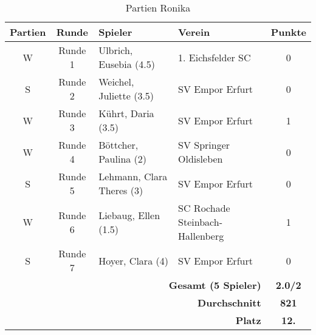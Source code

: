 \begin{table}[H]
\begin{tabular}{|c|c|l|l|c|}
\hline
\textbf{Partien} & \textbf{Runde} & \textbf{Spieler} & \textbf{Verein} & \textbf{Punkte} \\ \hline
W & Runde 1 & Ulbrich, Eusebia (4.5) & 1. Eichsfelder SC & 0 \\ \hline
S & Runde 2 & Weichel, Juliette (3.5) & SV Empor Erfurt & 0 \\ \hline
W & Runde 3 & Kührt, Daria (3.5) & SV Empor Erfurt & 1 \\ \hline
W & Runde 4 & Böttcher, Paulina (2) & SV Springer Oldisleben & 0 \\ \hline
S & Runde 5 & Lehmann, Clara Theres (3) & SV Empor Erfurt & 0 \\ \hline
W & Runde 6 & Liebaug, Ellen (1.5) & SC Rochade Steinbach-Hallenberg & 1 \\ \hline
S & Runde 7 & Hoyer, Clara (4) & SV Empor Erfurt & 0 \\ \hline
\multicolumn{4}{|r|}{\textbf{Gesamt (5 Spieler)}} & \textbf{2.0/2} \\ \hline
\multicolumn{4}{|r|}{\textbf{Durchschnitt}} & \textbf{821} \\ \hline
\multicolumn{4}{|r|}{\textbf{Platz}} & \textbf{12.} \\ \hline
\end{tabular}
\caption{Partien Ronika}
\end{table}